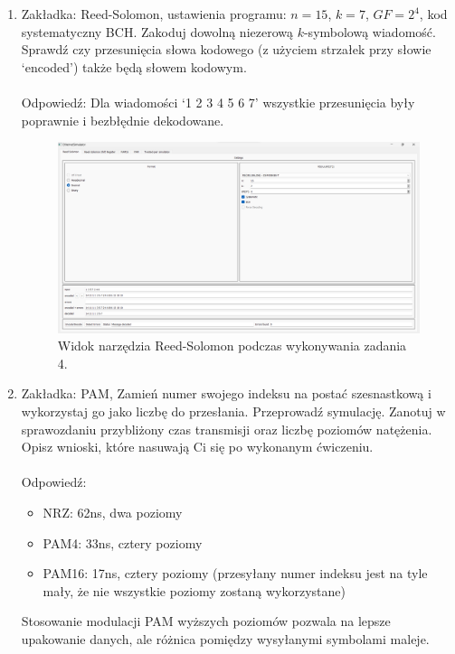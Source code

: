 \begin{enumerate}
    \item Zakładka: Reed-Solomon, ustawienia programu: $n = 15$, $k=7$, $GF = 2^4$,
    kod systematyczny BCH.
    Zakoduj dowolną niezerową $k$-symbolową wiadomość. Sprawdź czy przesunięcia słowa kodowego
    (z użyciem strzałek przy słowie `encoded') także będą słowem kodowym. \\ \\
    Odpowiedź: Dla wiadomości `1 2 3 4 5 6 7' wszystkie przesunięcia były poprawnie i bezbłędnie dekodowane.
    

    \begin{figure}[H]
        \centering
        \includegraphics[width=\textwidth]{images/rozwiazania_4.png}
        \caption{Widok narzędzia Reed-Solomon podczas wykonywania zadania 4.}
        \label{fig:rozwiazania_4}
    \end{figure}
    
    \item Zakładka: PAM, Zamień numer swojego indeksu na postać szesnastkową i wykorzystaj go jako liczbę do przesłania. Przeprowadź symulację. Zanotuj w sprawozdaniu
    przybliżony czas transmisji oraz liczbę poziomów natężenia. Opisz wnioski, które nasuwają Ci się po wykonanym ćwiczeniu. \\ \\
    Odpowiedź:
    \begin{itemize}
        \item NRZ: 62ns, dwa poziomy
        \item PAM4: 33ns, cztery poziomy
        \item PAM16: 17ns, cztery poziomy (przesyłany numer indeksu jest na tyle mały, że nie wszystkie poziomy zostaną wykorzystane)
    \end{itemize}
    Stosowanie modulacji PAM wyższych poziomów pozwala na lepsze upakowanie danych, ale różnica pomiędzy wysyłanymi symbolami maleje.
    


\end{enumerate}
